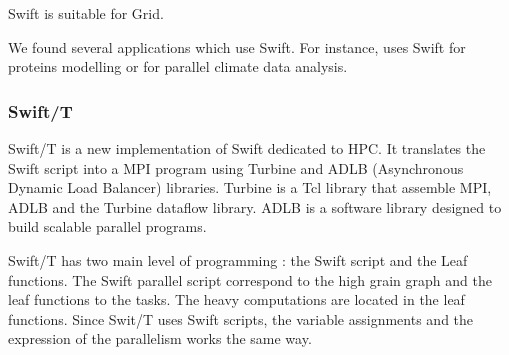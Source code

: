 Swift is suitable for Grid.

We found several applications which use Swift.
For instance, \cite{APWXF2011} uses Swift for proteins modelling or \cite{WoiDS2011} for parallel climate data analysis.

\subsubsection{Swift/T}
Swift/T \cite{WAWKL2013} is a new implementation of Swift dedicated to HPC.
It translates the Swift script into a MPI program using Turbine \cite{WAMLK2012} and ADLB (Asynchronous Dynamic Load Balancer) \cite{LusPB2010} libraries.
Turbine is a Tcl library that assemble MPI, ADLB and the Turbine dataflow library.
ADLB is a software library designed to build scalable parallel programs.

Swift/T has two main level of programming : the Swift script and the Leaf functions.
The Swift parallel script correspond to the high grain graph and the leaf functions to the tasks.
The heavy computations are located in the leaf functions.
Since Swit/T uses Swift scripts, the variable assignments and the expression of the parallelism works the same way.

